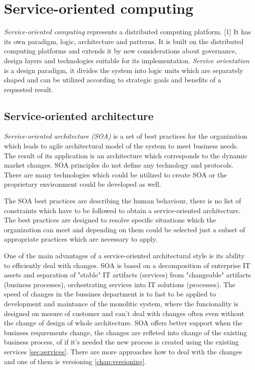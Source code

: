 \chapter{Service-oriented computing}
\label{chap:service-oriented computing}
\emph{Service-oriented computing} represents a distributed computing platform. [1] It has its own paradigm, logic, architecture and patterns. It is built on the distributed computing platforms and extends it by new considerations about governance, design layers and technologies suitable for its implementation.
\emph{Service orientation} is a design paradigm, it divides the system into logic units which are separately shaped and can be utilized according to strategic goals and benefits of a requested result.

\section{Service-oriented architecture}
\emph{Service-oriented architecture (SOA)} is a set of best practices for the organization which leads to agile architectural model of the system to meet business needs. The result of its application is an architecture which corresponds to the dynamic market changes. SOA principles do not define any technology and protocols. There are many technologies which could be utilized to create SOA or the proprietary environment could be developed as well. 

The SOA best practices are describing the human behaviour, there is no list of constraints which have to be followed to obtain a service-oriented architecture. The best practices are designed to resolve specific situations which the organization can meet and depending on them could be selected just a subset of appropriate practices which are necessary to apply.

One of the main advantages of a service-oriented architectural style is its ability to efficiently deal with changes. SOA is based on a decomposition of enterprise IT assets and separation of "stable" IT artifacts (services) from "changeable" artifacts (business processes), orchestrating services into IT solutions (processes). %
The speed of changes in the bussines department is to fast to be applied to development and maintance of the monolitic system, where the funcionality is designed on mesure of customer and can't deal with changes often even without the change of design of whole architecture. SOA offers better support when the business requrements change, the changes are refleted into change of the existing business process, of if it's needed the new process is created using the existing services \ref{sec:services}. There are more approaches how to deal with the changes and one of them is versioning \ref{chap:versioning}.


